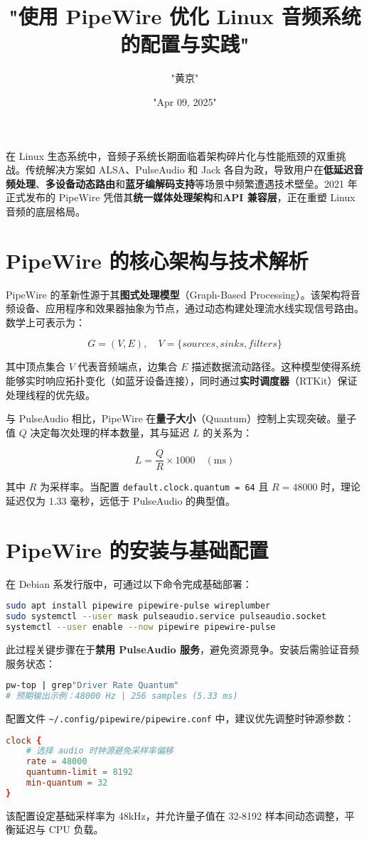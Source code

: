 \title{"使用 PipeWire 优化 Linux 音频系统的配置与实践"}
\author{"黄京"}
\date{"Apr 09, 2025"}
\maketitle
在 Linux 生态系统中，音频子系统长期面临着架构碎片化与性能瓶颈的双重挑战。传统解决方案如 ALSA、PulseAudio 和 Jack 各自为政，导致用户在\textbf{低延迟音频处理}、\textbf{多设备动态路由}和\textbf{蓝牙编解码支持}等场景中频繁遭遇技术壁垒。2021 年正式发布的 PipeWire 凭借其\textbf{统一媒体处理架构}和\textbf{API 兼容层}，正在重塑 Linux 音频的底层格局。\par
\chapter{PipeWire 的核心架构与技术解析}
PipeWire 的革新性源于其\textbf{图式处理模型}（Graph-Based Processing）。该架构将音频设备、应用程序和效果器抽象为节点，通过动态构建处理流水线实现信号路由。数学上可表示为：\par
$$ G = (V, E),\quad V = \{sources, sinks, filters\} $$\par
其中顶点集合 $V$ 代表音频端点，边集合 $E$ 描述数据流动路径。这种模型使得系统能够实时响应拓扑变化（如蓝牙设备连接），同时通过\textbf{实时调度器}（RTKit）保证处理线程的优先级。\par
与 PulseAudio 相比，PipeWire 在\textbf{量子大小}（Quantum）控制上实现突破。量子值 $Q$ 决定每次处理的样本数量，其与延迟 $L$ 的关系为：\par
$$ L = \frac{Q}{R} \times 1000\quad (\text{ms}) $$\par
其中 $R$ 为采样率。当配置 \verb!default.clock.quantum = 64! 且 $R=48000$ 时，理论延迟仅为 $1.33$ 毫秒，远低于 PulseAudio 的典型值。\par
\chapter{PipeWire 的安装与基础配置}
在 Debian 系发行版中，可通过以下命令完成基础部署：\par
\begin{lstlisting}[language=bash]
sudo apt install pipewire pipewire-pulse wireplumber
sudo systemctl --user mask pulseaudio.service pulseaudio.socket
systemctl --user enable --now pipewire pipewire-pulse
\end{lstlisting}
此过程关键步骤在于\textbf{禁用 PulseAudio 服务}，避免资源竞争。安装后需验证音频服务状态：\par
\begin{lstlisting}[language=bash]
pw-top | grep"Driver Rate Quantum"
# 预期输出示例：48000 Hz | 256 samples (5.33 ms)
\end{lstlisting}
配置文件 \verb!~/.config/pipewire/pipewire.conf! 中，建议优先调整时钟源参数：\par
\begin{lstlisting}[language=conf]
clock {
    # 选择 audio 时钟源避免采样率偏移
    rate = 48000
    quantumn-limit = 8192
    min-quantum = 32
}
\end{lstlisting}
该配置设定基础采样率为 48kHz，并允许量子值在 32-8192 样本间动态调整，平衡延迟与 CPU 负载。\par
